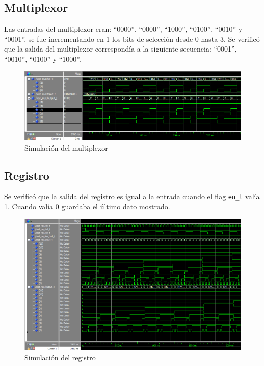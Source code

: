 \documentclass[10pt,spanish,a4paper,openany,notitlepage]{article}
\begin{document}
\subsection{Multiplexor}

Las entradas del multiplexor eran: ``0000'', ``0000'', ``1000'', ``0100'', ``0010''
y ``0001''. se fue incrementando en 1 los bits de selección desde 0 hasta
3. Se verificó que la salida del multiplexor correspondía a la
siguiente secuencia: ``0001'', ``0010'', ``0100'' y ``1000''.

\begin{figure}[H] %
\begin{center}
\includegraphics[scale=0.5]{./imagenes/mux_test.png}
\caption{Simulación del multiplexor}
 \label{fig:sim_mux}
\end{center}
\end{figure}


\subsection{Registro}

Se verificó que la salida del registro es igual a la entrada cuando
el flag \texttt{en\_t} valía 1. Cuando valía 0 guardaba el último dato
mostrado.

\begin{figure}[H] %
\begin{center}
\includegraphics[scale=0.5]{./imagenes/reg_test.png}
\caption{Simulación del registro}
 \label{fig:sim_reg}
\end{center}
\end{figure}
\end{document}
